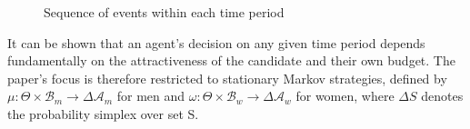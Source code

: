 \begin{figure}[ht]
    \centering
    \caption{Sequence of events within each time period} \label{fig:timeline}
\end{figure}

It can be shown that an agent’s decision on any given time period depends fundamentally on the attractiveness of the candidate and their own budget. The paper's focus is therefore restricted to stationary Markov strategies, defined by $\mu: \Theta \times\mathcal{B}_m\rightarrow \Delta\mathcal{A}_m$ for men and $\omega:\Theta \times\mathcal{B}_w\rightarrow \Delta\mathcal{A}_w$ for women, where $\Delta S$ denotes the probability simplex over set S. 

